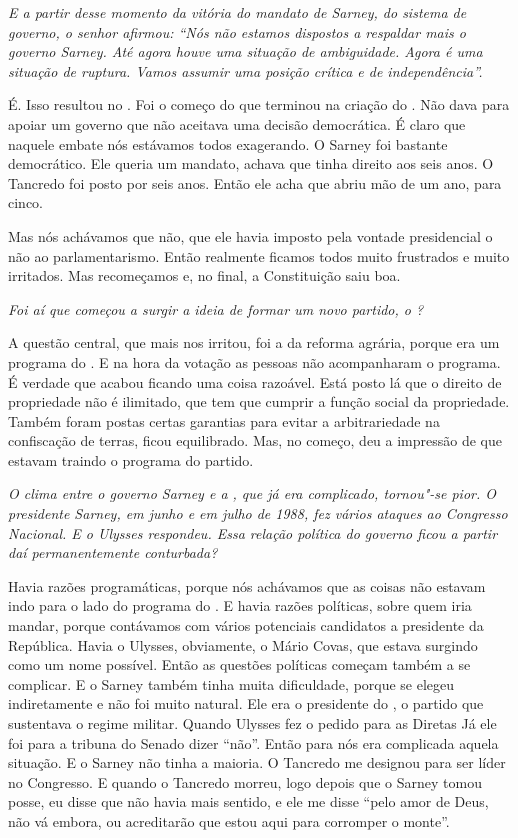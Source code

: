 \medskip

\noindent\emph{E a partir desse momento da vitória do mandato de Sarney, do
sistema de governo, o senhor afirmou: ``Nós não estamos dispostos a
respaldar mais o governo Sarney. Até agora houve uma situação de
ambiguidade. Agora é uma situação de ruptura. Vamos assumir uma posição
crítica e de independência''.}

É. Isso resultou no . Foi o começo do que terminou na
criação do . Não dava para apoiar um governo que não aceitava uma
decisão democrática. É claro que naquele embate nós estávamos todos
exagerando. O Sarney foi bastante democrático. Ele queria um mandato,
achava que tinha direito aos seis anos. O Tancredo foi posto por seis
anos. Então ele acha que abriu mão de um ano, para cinco.

Mas nós achávamos que não, que ele havia imposto pela vontade
presidencial o não ao parlamentarismo. Então realmente ficamos todos
muito frustrados e muito irritados. Mas recomeçamos e, no final, a
Constituição saiu boa.

\medskip

\noindent\emph{Foi aí que começou a surgir a ideia de formar um novo partido, o
?}

A questão central, que mais nos irritou, foi a da reforma
agrária, porque era um programa do . E na hora da votação as pessoas
não acompanharam o programa. É verdade que acabou ficando uma coisa
razoável. Está posto lá que o direito de propriedade não é ilimitado,
que tem que cumprir a função social da propriedade. Também foram postas
certas garantias para evitar a arbitrariedade na confiscação de terras,
ficou equilibrado. Mas, no começo, deu a impressão de que estavam
traindo o programa do partido.

\medskip

\noindent\emph{O clima entre o governo Sarney e a , que já era complicado,
tornou"-se pior. O presidente Sarney, em junho e em julho de 1988, fez
vários ataques ao Congresso Nacional. E o Ulysses respondeu. Essa
relação política do governo ficou a partir daí permanentemente
conturbada?}

Havia razões programáticas, porque nós achávamos que as
coisas não estavam indo para o lado do programa do . E havia razões
políticas, sobre quem iria mandar, porque contávamos com vários
potenciais candidatos a presidente da República. Havia o Ulysses,
obviamente, o Mário Covas, que estava surgindo como um nome possível.
Então as questões políticas começam também a se complicar. E o Sarney
também tinha muita dificuldade, porque se elegeu indiretamente e não foi
muito natural. Ele era o presidente do , o partido que sustentava o
regime militar. Quando Ulysses fez o pedido para as Diretas Já ele foi
para a tribuna do Senado dizer ``não''. Então para nós era complicada
aquela situação. E o Sarney não tinha a maioria. O Tancredo me designou
para ser líder no Congresso. E quando o Tancredo morreu, logo depois
que o Sarney tomou posse, eu disse que não havia mais sentido, e ele me
disse ``pelo amor de Deus, não vá embora, ou acreditarão que estou aqui
para corromper o monte''.

